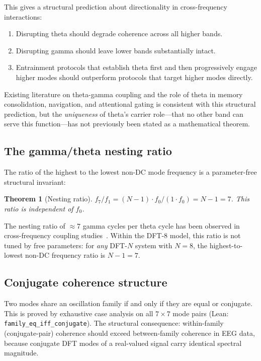 \documentclass[11pt,a4paper]{article}
\newtheorem{theorem}{Theorem}
\begin{document}
This gives a structural prediction about directionality in
cross-frequency interactions:
\begin{enumerate}
  \item Disrupting theta should degrade coherence across all higher
    bands.
  \item Disrupting gamma should leave lower bands substantially intact.
  \item Entrainment protocols that establish theta first and then
    progressively engage higher modes should outperform protocols that
    target higher modes directly.
\end{enumerate}

\noindent Existing literature on theta-gamma coupling
\citep{lisman2013,canolty2010,jensen2007} and the role of theta in
memory consolidation, navigation, and attentional gating is consistent
with this structural prediction, but the \emph{uniqueness} of theta's
carrier role---that no other band can serve this function---has not
previously been stated as a mathematical theorem.

\subsection{The gamma/theta nesting ratio}

The ratio of the highest to the lowest non-DC mode frequency is a
parameter-free structural invariant:
\begin{theorem}[Nesting ratio]
\label{thm:nesting}
$f_7 / f_1 = (N-1) \cdot f_0 / (1 \cdot f_0) = N - 1 = 7$.
This ratio is independent of $f_0$.
\end{theorem}

\noindent The nesting ratio of $\approx 7$ gamma cycles per theta
cycle has been observed in cross-frequency coupling
studies~\citep{lisman2013,canolty2010}. Within the DFT-8 model, this
ratio is not tuned by free parameters: for \emph{any} DFT-$N$ system
with $N = 8$, the highest-to-lowest non-DC frequency ratio is
$N - 1 = 7$.

\subsection{Conjugate coherence structure}

Two modes share an oscillation family if and only if they are equal or
conjugate.  This is proved by exhaustive case analysis on all
$7 \times 7$ mode pairs (Lean: \texttt{family\_eq\_iff\_conjugate}).
The structural consequence: within-family (conjugate-pair) coherence
should exceed between-family coherence in EEG data, because conjugate
DFT modes of a real-valued signal carry identical spectral magnitude.
\end{document}
